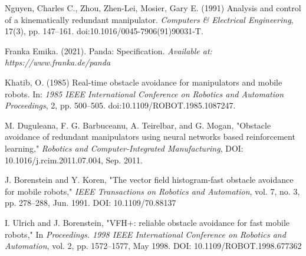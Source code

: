 \documentclass[a4paper]{article}
\begin{document}
\small
\begin{thebibliography}{1}
	
	
 Nguyen, Charles C., Zhou, Zhen-Lei, Mosier, Gary E. (1991) Analysis and control of a kinematically redundant manipulator. \textit{Computers \& Electrical Engineering}, 17(3), pp. 147–161. doi:10.1016/0045-7906(91)90031-T.

 Franka Emika. (2021). Panda: Specification. \textit{Available at: https://www.franka.de/panda}

 Khatib, O. (1985) Real-time obstacle avoidance for manipulators and mobile robots. In: \textit{1985 IEEE International Conference on Robotics and Automation Proceedings}, 2, pp. 500–505. doi:10.1109/ROBOT.1985.1087247.

M. Duguleana, F. G. Barbuceanu, A. Teirelbar, and G. Mogan,
"Obstacle avoidance of redundant manipulators using neural networks based reinforcement learning,"
\textit{Robotics and Computer-Integrated Manufacturing}, 
DOI: 10.1016/j.rcim.2011.07.004, Sep. 2011.

J. Borenstein and Y. Koren,
"The vector field histogram-fast obstacle avoidance for mobile robots,"
\textit{IEEE Transactions on Robotics and Automation}, 
vol. 7, no. 3, pp. 278–288, Jun. 1991.
DOI: 10.1109/70.88137

I. Ulrich and J. Borenstein,
"VFH+: reliable obstacle avoidance for fast mobile robots,"
In \textit{Proceedings. 1998 IEEE International Conference on Robotics and Automation}, 
vol. 2, pp. 1572–1577, May 1998.
DOI: 10.1109/ROBOT.1998.677362







\end{thebibliography}
\end{document}
